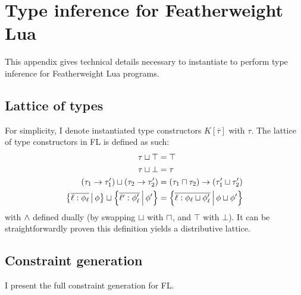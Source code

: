 \chapter{Type inference for Featherweight Lua}
\label{extra:fl-constraints}

This appendix gives technical details necessary to instantiate \inference{} to perform type inference for Featherweight Lua programs.

\section{Lattice of types}

For simplicity, I denote instantiated type constructors $K[\overline \tau]$ with $\tau$.
The lattice of type constructors in FL is defined as such:
\begin{align*}
    \tau \cjoin \top &= \top \\ 
    \tau \cjoin \bot &= \tau \\
    (\tau_1 \to \tau_1') \cjoin (\tau_2 \to \tau_2') &= (\tau_1 \cmeet \tau_2) \to (\tau_1' \cjoin \tau_2') \\ 
    \flext{\overline{\ell: \phi_\ell}}{\phi} \cjoin \flext{\overline{\ell': \phi_\ell'}}{\phi'} &= \flext{\overline{\ell: \phi_\ell \cjoin \phi_\ell'}}{\phi \cjoin \phi'}
\end{align*}
with $\land$ defined dually (by swapping $\sqcup$ with $\sqcap$, and $\top$ with $\bot$). It can be straightforwardly proven this definition yields a distributive lattice.

\section{Constraint generation}
\label{extra-sec:fl-cstrs}

I present the full constraint generation for FL.

